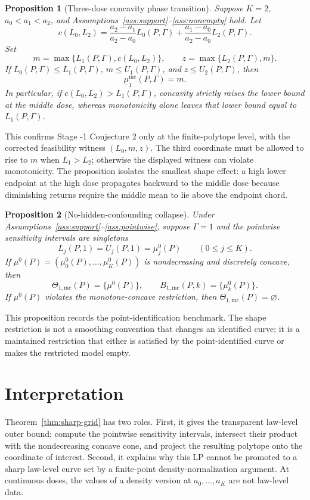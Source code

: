 \documentclass[11pt]{article}
\theoremstyle{definition}
\theoremstyle{plain}
\newtheorem{proposition}{Proposition}
\theoremstyle{remark}
\begin{document}
\begin{proposition}[Three-dose concavity phase transition]\label{prop:three-dose}
Suppose \(K=2\), \(a_0<a_1<a_2\), and Assumptions~\ref{ass:support}--\ref{ass:nonempty} hold.  Let
\[
  c(L_0,L_2)
  =
  \frac{a_2-a_1}{a_2-a_0}L_0(P,\Gamma)
  +
  \frac{a_1-a_0}{a_2-a_0}L_2(P,\Gamma).
\]
Set
\[
  m=\max\{L_1(P,\Gamma),c(L_0,L_2)\},
  \qquad
  z=\max\{L_2(P,\Gamma),m\}.
\]
If \(L_0(P,\Gamma)\le L_1(P,\Gamma)\), \(m\le U_1(P,\Gamma)\), and \(z\le U_2(P,\Gamma)\), then
\[
  \underline\mu^{\mathrm{mc}}_1(P,\Gamma)
  =
  m.
\]
In particular, if \(c(L_0,L_2)>L_1(P,\Gamma)\), concavity strictly raises the lower bound at the middle dose, whereas monotonicity alone leaves that lower bound equal to \(L_1(P,\Gamma)\).
\end{proposition}

This confirms Stage -1 Conjecture 2 only at the finite-polytope level, with the corrected feasibility witness \((L_0,m,z)\).  The third coordinate must be allowed to rise to \(m\) when \(L_1>L_2\); otherwise the displayed witness can violate monotonicity.  The proposition isolates the smallest shape effect: a high lower endpoint at the high dose propagates backward to the middle dose because diminishing returns require the middle mean to lie above the endpoint chord.

\begin{proposition}[No-hidden-confounding collapse]\label{prop:gamma-one}
Under Assumptions~\ref{ass:support}--\ref{ass:pointwise}, suppose \(\Gamma=1\) and the pointwise sensitivity intervals are singletons
\[
  L_j(P,1)=U_j(P,1)=\mu_j^0(P)\qquad(0\le j\le K).
\]
If \(\mu^0(P)=(\mu_0^0(P),\ldots,\mu_K^0(P))\) is nondecreasing and discretely concave, then
\[
  \Theta_{1,\mathrm{mc}}(P)=\{\mu^0(P)\},
  \qquad
  B_{1,\mathrm{mc}}(P,k)=\{\mu_k^0(P)\}.
\]
If \(\mu^0(P)\) violates the monotone-concave restriction, then \(\Theta_{1,\mathrm{mc}}(P)=\varnothing\).
\end{proposition}

This proposition records the point-identification benchmark.  The shape restriction is not a smoothing convention that changes an identified curve; it is a maintained restriction that either is satisfied by the point-identified curve or makes the restricted model empty.

\section{Interpretation}
Theorem~\ref{thm:sharp-grid} has two roles.  First, it gives the transparent law-level outer bound: compute the pointwise sensitivity intervals, intersect their product with the nondecreasing concave cone, and project the resulting polytope onto the coordinate of interest.  Second, it explains why this LP cannot be promoted to a sharp law-level curve set by a finite-point density-normalization argument.  At continuous doses, the values of a density version at \(a_0,\ldots,a_K\) are not law-level data.
\end{document}
